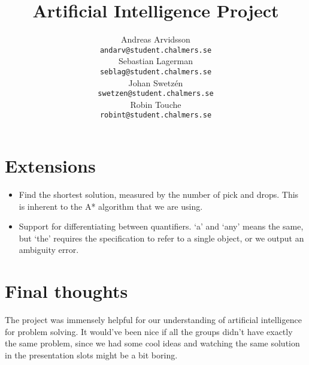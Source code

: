 \documentclass[11pt]{article}
\title{Artificial Intelligence Project}
\author{Andreas Arvidsson \\
  {\tt andarv@student.chalmers.se} \\
  Sebastian Lagerman \\
  {\tt seblag@student.chalmers.se} \\
  Johan Swetz\'{e}n \\
  {\tt swetzen@student.chalmers.se} \\
  Robin Touche \\
  {\tt robint@student.chalmers.se} \\}
\date{}
\begin{document}
\maketitle















\section*{Extensions}
\begin{itemize}
\iten Ambiguity resolution by listing possible different objects, eg. ``You could mean the Yellow Box or the Red Box'', if the user wanted to pick ``the large box'' although there were two of them.
\item Find the shortest solution, measured by the number of pick and drops. This is inherent to the A* algorithm that we are using.
\item Support for differentiating between quantifiers. `a' and `any' means the same, but `the' requires the specification to refer to a single object, or we output an ambiguity error.
\end{itemize}

\section*{Final thoughts}
The project was immensely helpful for our understanding of artificial intelligence for problem solving. It would've been nice if all the groups didn't have exactly the same problem, since we had some cool ideas and watching the same solution in the presentation slots might be a bit boring.
\end{document}
